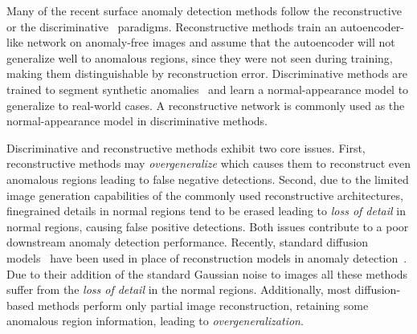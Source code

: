 \documentclass[10pt,twocolumn,letterpaper]{article}
\begin{document}
Many of the recent surface anomaly detection methods follow the reconstructive~\cite{ZavrtanikInpainting,AnnoDDPM, fanogan, ganomaly} or the discriminative~\cite{dsr, draem} paradigms. Reconstructive methods train an autoencoder-like network on anomaly-free images and assume that the autoencoder will not generalize well to anomalous regions, since they were not seen during training, making them distinguishable by reconstruction error. Discriminative methods are trained to segment synthetic anomalies~\cite{draem, memseg,zhang2023destseg} and learn a normal-appearance model to generalize to real-world cases. A reconstructive network is commonly used as the normal-appearance model in discriminative methods.

Discriminative and reconstructive methods exhibit two core issues. First, reconstructive methods may \textit{overgeneralize} which causes them to reconstruct even anomalous regions leading to false negative detections. Second, due to the limited image generation capabilities of the commonly used reconstructive architectures, finegrained details in normal regions tend to be erased leading to \textit{loss of detail} in normal regions, causing false positive detections. Both issues contribute to a poor downstream anomaly detection performance. Recently, standard diffusion models~\cite{ddpm, ddim, diffusion-vit} have been used in place of reconstruction models in anomaly detection~\cite{AnnoDDPM,ddpm-noise-anomaly, ldm_draem}. Due to their addition of the standard Gaussian noise to images all these methods suffer from the \textit{loss of detail} in the normal regions. 
Additionally, most diffusion-based methods perform only partial image reconstruction, retaining some anomalous region information, leading to \textit{overgeneralization}.
\end{document}
